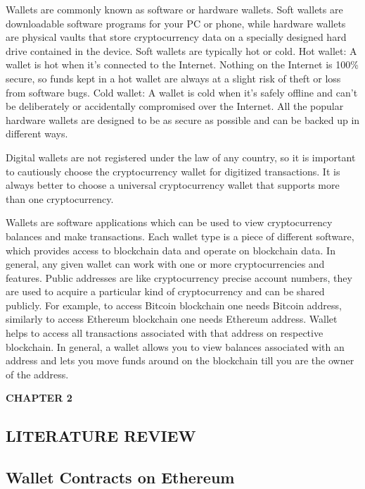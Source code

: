 \documentclass[12pt]{article}
\begin{document}
\newpage
  Wallets are commonly known as software or hardware
wallets. Soft wallets are downloadable software programs
for your PC or phone, while hardware wallets are physical
vaults that store cryptocurrency data on a specially designed
hard drive contained in the device. Soft wallets are typically
hot or cold. Hot wallet: A wallet is hot when it’s connected
to the Internet. Nothing on the Internet is 100\% secure, so
funds kept in a hot wallet are always at a slight risk of theft
or loss from software bugs. Cold wallet: A wallet is cold
when it’s safely offline and can’t be deliberately or
accidentally compromised over the Internet. All the popular
hardware wallets are designed to be as secure as possible
and can be backed up in different ways. \par
Digital wallets are not registered under the law of any
country, so it is important to cautiously choose the
cryptocurrency wallet for digitized transactions. It is always
better to choose a universal cryptocurrency wallet that
supports more than one cryptocurrency. \par
Wallets are software applications which can be used to
view cryptocurrency balances and make transactions. Each
wallet type is a piece of different software, which provides
access to blockchain data and operate on blockchain data. In
general, any given wallet can work with one or more
cryptocurrencies and features. Public addresses are like
cryptocurrency precise account numbers, they are used to
acquire a particular kind of cryptocurrency and can be
shared publicly. For example, to access Bitcoin blockchain
one needs Bitcoin address, similarly to access Ethereum
blockchain one needs Ethereum address. Wallet helps to
access all transactions associated with that address on
respective blockchain. In general, a wallet allows you to
view balances associated with an address and lets you move
funds around on the blockchain till you are the owner of the
address.
\newpage


\begin{flushleft}\textbf{CHAPTER 2}\end{flushleft}
\begin{flushleft}\section{LITERATURE REVIEW}\end{flushleft}
\vspace*{10px}
\subsection{Wallet Contracts on Ethereum}
\end{document}
